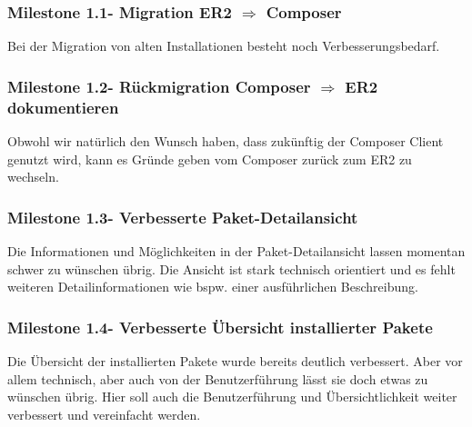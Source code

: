 \documentclass[
paper=a4,
draft=false,%
fontsize=10pt%
]{scrartcl}
\begin{document}
\subsubsection[Milestone 1.1 - Migration ER2 $ \Rightarrow $ Composer]{Milestone 1.1\footnotemark - Migration ER2 $ \Rightarrow $ Composer}

Bei der Migration von alten Installationen besteht noch Verbesserungsbedarf.

\subsubsection[Milestone 1.2 - Rückmigration Composer $ \Rightarrow $ ER2 dokumentieren]{Milestone 1.2\footnotemark - Rückmigration Composer $ \Rightarrow $ ER2 dokumentieren}

Obwohl wir natürlich den Wunsch haben, dass zukünftig der Composer Client genutzt wird, kann es Gründe geben vom Composer zurück zum ER2 zu wechseln.

\subsubsection[Milestone 1.3 - Verbesserte Paket-Detailansicht]{Milestone 1.3\footnotemark - Verbesserte Paket-Detailansicht}

Die Informationen und Möglichkeiten in der Paket-Detailansicht lassen momentan schwer zu wünschen übrig. Die Ansicht ist stark technisch orientiert und es fehlt weiteren Detailinformationen wie bspw. einer ausführlichen Beschreibung.

\subsubsection[Milestone 1.4 - Verbesserte Übersicht installierter Pakete]{Milestone 1.4\footnotemark - Verbesserte Übersicht installierter Pakete}

Die Übersicht der installierten Pakete wurde bereits deutlich verbessert. Aber vor allem technisch, aber auch von der Benutzerführung lässt sie doch etwas zu wünschen übrig. Hier soll auch die Benutzerführung und Übersichtlichkeit weiter verbessert und vereinfacht werden.
\end{document}
